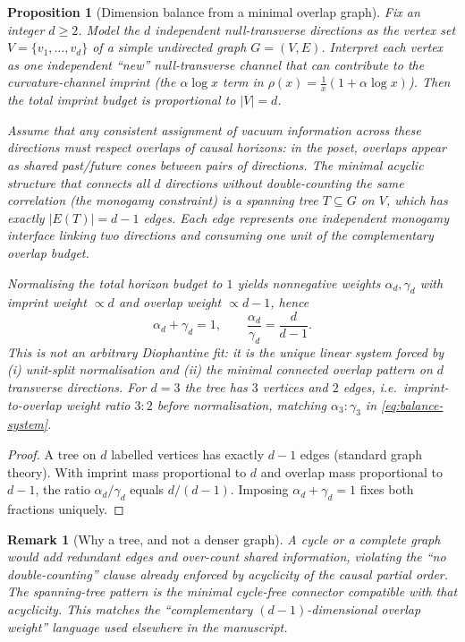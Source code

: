\documentclass[11pt]{amsart}
\newtheorem{proposition}[theorem]{Proposition}
\newtheorem{remark}[theorem]{Remark}
\begin{document}
\begin{proposition}[Dimension balance from a minimal overlap graph]
\label{prop:balance-spanning-tree}
Fix an integer \(d\ge 2\). Model the \(d\) independent null-transverse directions as the vertex set \(V=\{v_1,\dots,v_d\}\) of a simple undirected graph \(G=(V,E)\). Interpret each vertex as one independent ``new'' null-transverse channel that can contribute to the curvature-channel imprint (the \(\alpha\log x\) term in \(\rho(x)=\frac1x(1+\alpha\log x)\)). Then the total imprint budget is proportional to \(|V|=d\).

Assume that any consistent assignment of vacuum information across these directions must respect overlaps of causal horizons: in the poset, overlaps appear as shared past/future cones between pairs of directions. The minimal acyclic structure that connects all \(d\) directions without double-counting the same correlation (the monogamy constraint) is a spanning tree \(T\subseteq G\) on \(V\), which has exactly \(|E(T)|=d-1\) edges. Each edge represents one independent monogamy interface linking two directions and consuming one unit of the complementary overlap budget.

Normalising the total horizon budget to \(1\) yields nonnegative weights \(\alpha_d,\gamma_d\) with imprint weight \(\propto d\) and overlap weight \(\propto d-1\), hence
\begin{equation}
\label{eq:balance-system}
\alpha_d+\gamma_d=1,\qquad \frac{\alpha_d}{\gamma_d}=\frac{d}{d-1}.
\end{equation}
This is not an arbitrary Diophantine fit: it is the unique linear system forced by \emph{(i)} unit-split normalisation and \emph{(ii)} the minimal connected overlap pattern on \(d\) transverse directions. For \(d=3\) the tree has \(3\) vertices and \(2\) edges, i.e.\ imprint-to-overlap weight ratio \(3:2\) before normalisation, matching \(\alpha_3:\gamma_3\) in \eqref{eq:balance-system}.
\end{proposition}

\begin{proof}
A tree on \(d\) labelled vertices has exactly \(d-1\) edges (standard graph theory). With imprint mass proportional to \(d\) and overlap mass proportional to \(d-1\), the ratio \(\alpha_d/\gamma_d\) equals \(d/(d-1)\). Imposing \(\alpha_d+\gamma_d=1\) fixes both fractions uniquely.
\end{proof}

\begin{remark}[Why a tree, and not a denser graph]
\label{rem:tree-not-complete}
A cycle or a complete graph would add redundant edges and over-count shared information, violating the ``no double-counting'' clause already enforced by acyclicity of the causal partial order. The spanning-tree pattern is the minimal cycle-free connector compatible with that acyclicity. This matches the ``complementary \((d-1)\)-dimensional overlap weight'' language used elsewhere in the manuscript.
\end{remark}
\end{document}
